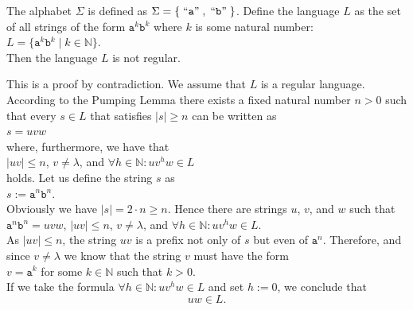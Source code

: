 \begin{Proposition}
  The alphabet  $\Sigma$ is defined as $\Sigma = \{ \;\mbox{``\texttt{a}''}\;, \;\mbox{``\texttt{b}''}\; \}$.
  Define the language $L$ as the set of all strings of the form $\mathtt{a}^k\mathtt{b}^k$ where $k$
  is some natural number:
  \\[0.2cm]
  \hspace*{1.3cm}
  $L = \bigl\{ \mathtt{a}^k\mathtt{b}^k \mid k \in \mathbb{N} \bigr\}$.
  \\[0.2cm]
  Then the language  $L$ is not regular.
\end{Proposition}

\proofEng
This is a proof by contradiction. We assume that $L$ is a regular language.  According to the
Pumping Lemma there exists a fixed natural number $n>0$ such that every $s \in L$ that satisfies  $|s|
\geq n$ can be written as
\\[0.2cm]
\hspace*{1.3cm}
$s = uvw$
\\[0.2cm]
where, furthermore, we have that
\\[0.2cm]
\hspace*{1.3cm}
$|uv| \leq n$, \quad $v \not= \lambda$, \quad and \quad $\forall h \in \mathbb{N}: uv^h w \in L$
\\[0.2cm]
holds.  Let us define the string $s$ as
\\[0.2cm]
\hspace*{1.3cm}
$s := \mathtt{a}^{n} \mathtt{b}^{n}$.
\\[0.2cm]
Obviously we have $|s| = 2 \cdot n \geq n$.  Hence there are strings $u$, $v$, and $w$
such that 
\\[0.2cm]
\hspace*{1.3cm}
$\mathtt{a}^{n}\mathtt{b}^{n} = uvw$, \quad $|uv| \leq n$, \quad $v \not= \lambda$, 
\quad and \quad $\forall h \in \mathbb{N}: uv^h w \in L$.
\\[0.2cm]
As $|uv| \leq n$, the string $uv$ is a prefix not only of $s$ but even of $\mathtt{a}^n$. Therefore,
and since $v \not= \lambda$ we know that the string $v$ must have the form
\\[0.2cm]
\hspace*{1.3cm}
$v = \mathtt{a}^k$ \quad for some $k \in \mathbb{N}$ such that $k > 0$.
\\[0.2cm]
If we take the formula $\forall h \in \mathbb{N}: uv^h w \in L$ and set  $h:=0$, we conclude that
\begin{equation}
  \label{eq:pumping5}
 uw \in L. 
\end{equation}
